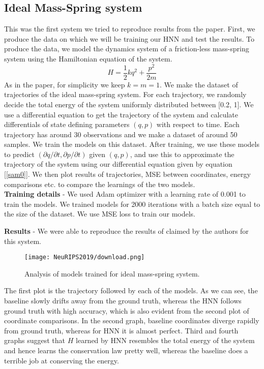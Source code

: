 \documentclass{article}
\begin{document}
\subsection{Ideal Mass-Spring system}
This was the first system we tried to reproduce results from the paper. First, we produce the data on which we will be training our HNN and test the results. To produce the data, we model the dynamics system of a friction-less mass-spring system using the Hamiltonian equation of the system.
\begin{equation}
H = \frac{1}{2}kq^2 + \frac{p^2}{2m}
\end{equation}
As in the paper, for simplicity we keep \(k = m = 1\). We make the dataset of trajectories of the ideal mass-spring system. For each trajectory, we randomly decide the total energy of the system uniformly distributed between [0.2, 1]. We use a differential equation to get the trajectory of the system and calculate differentials of state defining parameters \((q, p)\) with respect to time. Each trajectory has around 30 observations and we make a dataset of around 50 samples. We train the models on this dataset. After training, we use these models to predict \((\partial q/\partial t, \partial p/\partial t)\) given \((q, p)\), and use this to approximate the trajectory of the system using our differential equation given by equation [\ref{sam0}]. We then plot results of trajectories, MSE between coordinates, energy comparisons etc. to compare the learnings of the two models.\\
\textbf{Training details} - We used Adam optimizer \cite{kingma2014adam} with a learning rate of 0.001 to train the models. We trained models for 2000 iterations with a batch size equal to the size of the dataset. We use MSE loss to train our models.

\textbf{Results} - We were able to reproduce the results of claimed by the authors for this system.
\begin{figure}[htp]
    \centering
    \texttt{[image: NeuRIPS2019/download.png]}
    \caption{Analysis of models trained for ideal mass-spring system.}
    \label{fig:galaxy}
\end{figure}

The first plot is the trajectory followed by each of the models. As we can see, the baseline slowly drifts away from the ground truth, whereas the HNN follows ground truth with high accuracy, which is also evident from the second plot of coordinate comparisons. In the second graph, baseline coordinates diverge rapidly from ground truth, whereas for HNN it is almost perfect. Third and fourth graphs suggest that \(H\) learned by HNN resembles the total energy of the system and hence learns the conservation law pretty well, whereas the baseline does a terrible job at conserving the energy.
\end{document}
